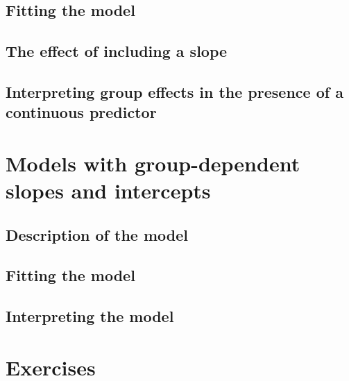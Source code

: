 \documentclass[
]{book}
\begin{document}
\hypertarget{fitting-the-model-4}{%
\subsection{Fitting the model}\label{fitting-the-model-4}}

\hypertarget{the-effect-of-including-a-slope}{%
\subsection{The effect of including a slope}\label{the-effect-of-including-a-slope}}

\hypertarget{interpreting-group-effects-in-the-presence-of-a-continuous-predictor}{%
\subsection{Interpreting group effects in the presence of a continuous predictor}\label{interpreting-group-effects-in-the-presence-of-a-continuous-predictor}}

\hypertarget{models-with-group-dependent-slopes-and-intercepts}{%
\section{Models with group-dependent slopes and intercepts}\label{models-with-group-dependent-slopes-and-intercepts}}

\hypertarget{description-of-the-model-6}{%
\subsection{Description of the model}\label{description-of-the-model-6}}

\hypertarget{fitting-the-model-5}{%
\subsection{Fitting the model}\label{fitting-the-model-5}}

\hypertarget{interpreting-the-model-3}{%
\subsection{Interpreting the model}\label{interpreting-the-model-3}}

\hypertarget{exercises-4}{%
\section{Exercises}\label{exercises-4}}
\end{document}
